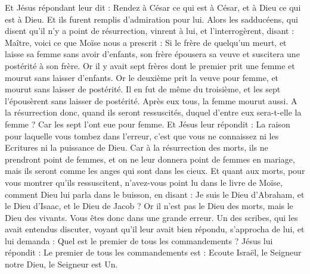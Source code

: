 \begin{multicols}{2}
Et Jésus répondant leur dit : Rendez à César ce qui est à César, et à Dieu ce qui est à Dieu. Et ils furent remplis d’admiration pour lui.
Alors les sadducéens, qui disent qu'il n'y a point de résurrection, vinrent à lui, et l'interrogèrent, disant :
Maître, voici ce que Moïse nous a prescrit : Si le frère de quelqu'un meurt, et laisse sa femme sans avoir d'enfants, son frère épousera sa veuve et suscitera une postérité à son frère.
Or il y avait sept frères dont le premier prit une femme et mourut sans laisser d'enfants.
Or le deuxième prit la veuve pour femme, et mourut sans laisser de postérité. Il en fut de même du troisième,
et les sept l’épousèrent sans laisser de postérité. Après eux tous, la femme mourut aussi.
A la résurrection donc, quand ils seront ressuscités, duquel d’entre eux sera-t-elle la femme ? Car les sept l’ont eue pour femme.
Et Jésus leur répondit : La raison pour laquelle vous tombez dans l'erreur, c'est que vous ne connaissez ni les Ecritures ni la puissance de Dieu.
Car à la résurrection des morts, ils ne prendront point de femmes, et on ne leur donnera point de femmes en mariage, mais ils seront comme les anges qui sont dans les cieux.
Et quant aux morts, pour vous montrer qu'ils ressuscitent, n'avez-vous point lu dans le livre de Moïse, comment Dieu lui parla dans le buisson, en disant : Je suis le Dieu d'Abraham, et le Dieu d'Isaac, et le Dieu de Jacob ?
Or il n'est pas le Dieu des morts, mais le Dieu des vivants. Vous êtes donc dans une grande erreur.
Un des scribes, qui les avait entendus discuter, voyant qu'il leur avait bien répondu, s'approcha de lui, et lui demanda : Quel est le premier de tous les commandements ?
Jésus lui répondit : Le premier de tous les commandements est : Ecoute Israël, le Seigneur notre Dieu, le Seigneur est Un.

\end{multicols}
